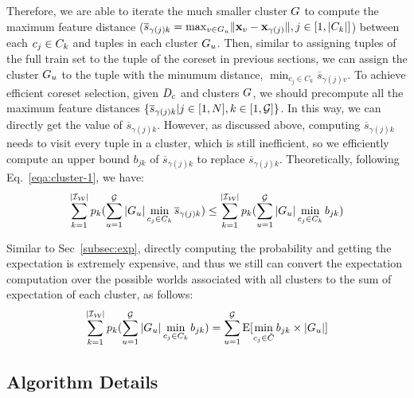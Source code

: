 Therefore,  we are able to iterate the much smaller cluster $G$ to compute  the maximum feature distance (\ie $\overline{s}_{\gamma(j)k} = \max_{v \in G_u} \lVert\mathbf{x}_v - \mathbf{x}_{\gamma(j)}\rVert, j \in [1,|C_k|]$) between each $c_j \in C_k$ and tuples in each cluster $G_u$. Then, similar to assigning tuples of the full train set to the tuple of the coreset in previous sections, we can assign the cluster $G_u$ to the tuple  with the minumum distance, \ie $\min_{c_j\in C_k} \overline{s}_{\gamma(j)v}$. To achieve efficient coreset selection, given $D_c$ and clusters $G$, we should precompute all the maximum feature distances $\{\overline{s}_{\gamma(j)k}|j \in [1,N], k \in [1,\mathcal{G}]\}$. In this way, we can directly get the value of $\overline{s}_{\gamma(j)k}$. However, as discussed above, computing $\overline{s}_{\gamma(j)k}$ needs to visit every tuple in a cluster, which is still inefficient, so we  efficiently compute an upper bound $b_{jk}$ of  $\overline{s}_{\gamma(j)k}$ to replace $\overline{s}_{\gamma(j)k}$. Theoretically, following Eq.~\ref{eqa:cluster-1}, we have:
\vspace{-0.5em}
\begin{equation}\label{eqa:cluster-3}
    \begin{aligned}
        \sum_{k= 1}^{|\mathcal{I_W}|} p_k (\sum_{u=1}^{\mathcal{G}} |G_u| \min_{c_j\in C_k} \overline{s}_{\gamma(j)k}) \leq \sum_{k= 1}^{|\mathcal{I_W}|} p_k (\sum_{u=1}^{\mathcal{G}} |G_u| \min_{c_j\in C_k} b_{jk})
    \end{aligned}
\end{equation}

Similar to Sec~\ref{subsec:exp}, directly computing the probability and getting the expectation is extremely expensive, and thus we still can convert the expectation computation over the possible worlds associated with all clusters to the sum of expectation of each cluster, as follows:
\vspace{-0.5em}
\begin{equation}\label{eqa:cluster-4}
    \begin{aligned}
        \sum_{k= 1}^{|\mathcal{I_W}|} p_k (\sum_{u=1}^{\mathcal{G}} |G_u| \min_{c_j\in C_k} b_{jk}) = \sum_{u=1}^{\mathcal{G}} \mathrm{E}[\min_{c_j\in \hat{C}}b_{jk} \times |G_u|]
    \end{aligned}
\end{equation}

\subsection{Algorithm Details}



